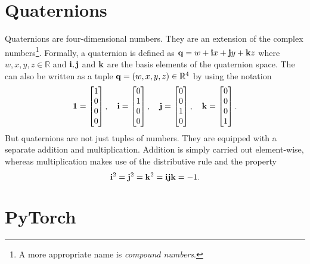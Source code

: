 	\section{Quaternions}
		Quaternions are four-dimensional numbers.
		They are an extension of the complex numbers\footnote{A more appropriate name is \emph{compound numbers}.}.
		Formally, a quaternion is defined as $\mathbf{q} = w + \mathbf{i}x + \mathbf{j}y + \mathbf{k}z$ where $w, x, y, z \in \mathbb{R}$ and $\mathbf{i},\mathbf{j}$ and $\mathbf{k}$ are the basis elements of the quaternion space.
		The  can also be written as a tuple $\mathbf{q} = (w, x, y, z) \in \mathbb{R}^4$ by using the notation
		\begin{equation}
			\mathbf{1} = 
			\begin{bmatrix}
				1 \\ 
				0 \\ 
				0 \\ 
				0
			\end{bmatrix},\quad
			\mathbf{i} = 
			\begin{bmatrix}
				0 \\ 
				1 \\ 
				0 \\ 
				0
			\end{bmatrix},\quad
			\mathbf{j} = 
			\begin{bmatrix}
				0 \\ 
				0 \\ 
				1 \\ 
				0
			\end{bmatrix},\quad
			\mathbf{k} =
			\begin{bmatrix}
				0 \\ 
				0 \\ 
				0 \\ 
				1
			\end{bmatrix}.
		\end{equation}
		But quaternions are not just tuples of numbers. 
		They are equipped with a separate addition and multiplication.
		Addition is simply carried out element-wise, whereas multiplication makes use of the distributive rule and the property
		\begin{equation}
			\mathbf{i}^2 = \mathbf{j}^2 = \mathbf{k}^2 = \mathbf{i}\mathbf{j}\mathbf{k} = -1.
		\end{equation}
		
		
	
	\section{PyTorch}